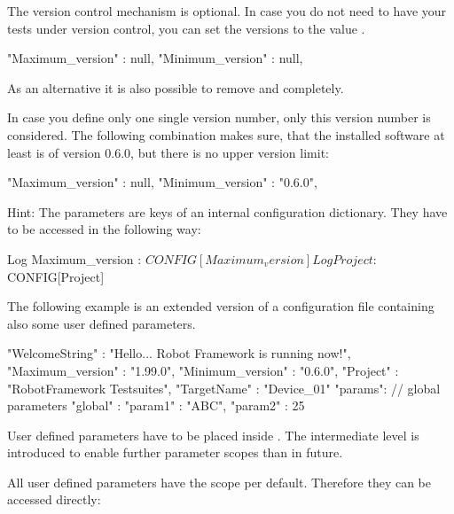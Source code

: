 The version control mechanism is optional. In case you do not need to have your tests under version control, you can set
the versions to the value .

\begin{pythoncode}
"Maximum_version" : null,
"Minimum_version" : null,
\end{pythoncode}

As an alternative it is also possible to remove  and  completely.

In case you define only one single version number, only this version number is considered. The following combination
makes sure, that the installed software at least is of version 0.6.0, but there is no upper version limit:

\begin{pythoncode}
"Maximum_version" : null,
"Minimum_version" : "0.6.0",
\end{pythoncode}

Hint: The parameters are keys of an internal configuration dictionary. They have to be accessed in the following way:

\begin{robotcode}
Log    Maximum_version : ${CONFIG}[Maximum_version]
Log    Project : ${CONFIG}[Project]
\end{robotcode}

\newpage

The following example is an extended version of a configuration file containing also some user defined parameters.

\begin{pythoncode}
{
  "WelcomeString"   : "Hello... Robot Framework is running now!",
  "Maximum_version" : "1.99.0",
  "Minimum_version" : "0.6.0",
  "Project"         : "RobotFramework Testsuites",
  "TargetName"      : "Device_01"
  "params": {
              // global parameters
              "global" : {
                           "param1" : "ABC",
                           "param2" : 25
                         }
            }
}
\end{pythoncode}

User defined parameters have to be placed inside . The intermediate level  is introduced to enable further
parameter scopes than  in future.

All user defined parameters have the scope  per default. Therefore they can be accessed directly:

